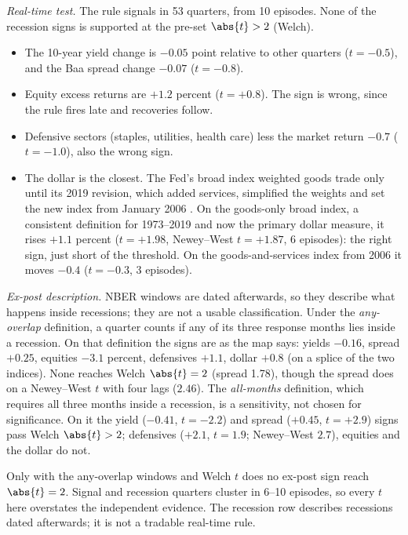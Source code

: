 \begin{qfdefinition}
\emph{Real-time test.} The rule signals in 53 quarters, from 10 episodes. None of the recession signs is supported at the pre-set $\abs{t}>2$ (Welch).
\begin{itemize}
\item The 10-year yield change is $-0.05$ point relative to other quarters ($t=-0.5$), and the Baa spread change $-0.07$ ($t=-0.8$).
\item Equity excess returns are $+1.2$ percent ($t=+0.8$). The sign is wrong, since the rule fires late and recoveries follow.
\item Defensive sectors (staples, utilities, health care) less the market return $-0.7$ ($t=-1.0$), also the wrong sign.
\item The dollar is the closest. The Fed's broad index weighted goods trade only until its 2019 revision, which added services, simplified the weights and set the new index from January 2006 \citep[secs.~II--III]{fed-dollar-index-revisions-2019}. On the goods-only broad index, a consistent definition for 1973--2019 and now the primary dollar measure, it rises $+1.1$ percent ($t=+1.98$, Newey--West $t=+1.87$, 6 episodes): the right sign, just short of the threshold. On the goods-and-services index from 2006 it moves $-0.4$ ($t=-0.3$, 3 episodes).
\end{itemize}

\emph{Ex-post description.} NBER windows are dated afterwards, so they describe what happens inside recessions; they are not a usable classification. Under the \emph{any-overlap} definition, a quarter counts if any of its three response months lies inside a recession. On that definition the signs are as the map says: yields $-0.16$, spread $+0.25$, equities $-3.1$ percent, defensives $+1.1$, dollar $+0.8$ (on a splice of the two indices). None reaches Welch $\abs{t}=2$ (spread 1.78), though the spread does on a Newey--West $t$ with four lags ($2.46$). The \emph{all-months} definition, which requires all three months inside a recession, is a sensitivity, not chosen for significance. On it the yield ($-0.41$, $t=-2.2$) and spread ($+0.45$, $t=+2.9$) signs pass Welch $\abs{t}>2$; defensives ($+2.1$, $t=1.9$; Newey--West $2.7$), equities and the dollar do not.

Only with the any-overlap windows and Welch $t$ does no ex-post sign reach $\abs{t}=2$. Signal and recession quarters cluster in 6--10 episodes, so every $t$ here overstates the independent evidence. The recession row describes recessions dated afterwards; it is not a tradable real-time rule.


\end{qfdefinition}
